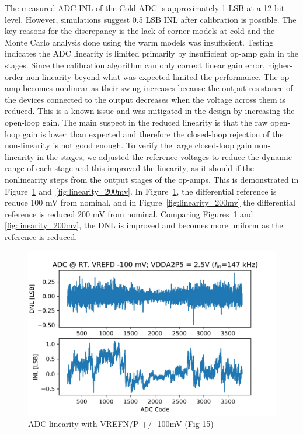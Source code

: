 \label{sec:5.3}
The measured ADC INL of the Cold ADC is approximately 1 LSB at a 12-bit level. However, simulations suggest 0.5 LSB INL after calibration is possible. The key reasons for the discrepancy is the lack of corner models at cold and the Monte Carlo analysis done using the warm models was insufficient. Testing indicates the ADC linearity is limited primarily by insufficient op-amp gain in the stages. Since the calibration algorithm can only correct linear gain error, higher-order non-linearity beyond what was expected limited the performance. The op-amp becomes nonlinear as their swing increases because the output resistance of the devices connected to the output decreases when the voltage across them is reduced. This is a known issue and was mitigated in the design by increasing the open-loop gain. The main suspect in the reduced linearity is that the raw open-loop gain is lower than expected and therefore the closed-loop rejection of the non-linearity is not good enough. To verify the large closed-loop gain non-linearity in the stages, we adjusted the reference voltages to reduce the dynamic range of each stage and this improved the linearity, as it should if the nonlinearity steps from the output stages of the op-amps. This is demonstrated in Figure~\ref{fig:linearity_100mv} and~\ref{fig:linearity_200mv}. In Figure~\ref{fig:linearity_100mv}, the differential reference is reduce 100 mV from nominal, and in Figure~\ref{fig:linearity_200mv} the differential reference is reduced 200 mV from nominal. Comparing Figures~\ref{fig:linearity_100mv} and \ref{fig:linearity_200mv}, the DNL is improved and becomes more uniform as the reference is reduced. 

\begin{figure}[h!]
\centering
  \includegraphics[width=0.7\linewidth]{figures/prakash_fig/linearity_100mv.JPG}
  \caption{ADC linearity with VREFN/P +/- 100mV (Fig 15)}
  \label{fig:linearity_100mv}
\end{figure}

